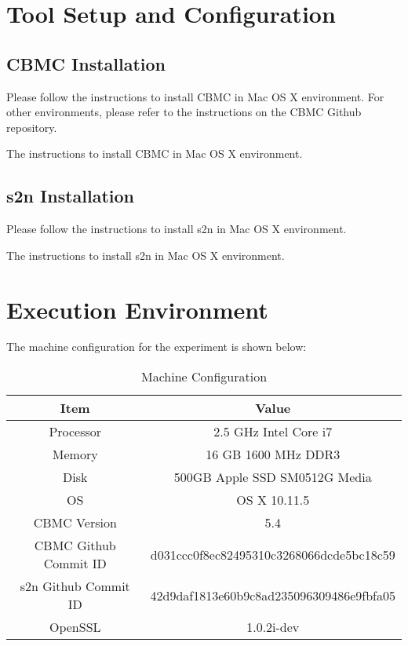 \section{Tool Setup and Configuration}
\label{sec:tsc}

\subsection{CBMC Installation}
Please follow the instructions to install CBMC in Mac OS X environment. For other environments, please refer to the instructions on the CBMC Github repository.
\begin{listing}[H]
\caption{The instructions to install CBMC in Mac OS X environment.}
\end{listing}

\subsection{s2n Installation}
Please follow the instructions to install s2n in Mac OS X environment.

\begin{listing}[H]
\caption{The instructions to install s2n in Mac OS X environment.}
\end{listing}

\newpage
\section{Execution Environment}
\label{sec:ee}

The machine configuration for the experiment is shown below:
\begin{table}[H]
    \centering
    \begin{tabular}{c|c}
        \hline
        \hline
        Item & Value \\
        \hline
        \hline
        Processor & 2.5 GHz Intel Core i7\\
        Memory & 16 GB 1600 MHz DDR3\\
        Disk & 500GB Apple SSD SM0512G Media\\
        OS & OS X 10.11.5\\
        CBMC Version & 5.4\\
        CBMC Github Commit ID & d031ccc0f8ec82495310c3268066dcde5bc18c59\\
        s2n Github Commit ID & 42d9daf1813e60b9c8ad235096309486e9fbfa05\\
        OpenSSL & 1.0.2i-dev \\
        \hline
        \hline
    \end{tabular}
    \caption{Machine Configuration}
    \label{tab:mc}
\end{table}

